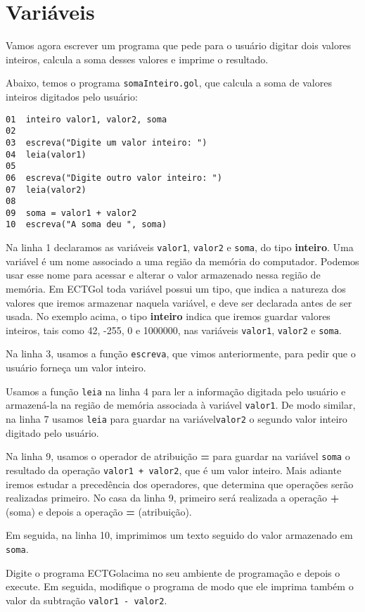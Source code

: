 \documentclass{report}
\newcommand{\Egol}{ECTGol\;}
\begin{document}
\section{Variáveis}

Vamos agora escrever um programa que pede para o usuário
digitar dois valores inteiros, calcula a soma desses valores
e imprime o resultado.

Abaixo, temos o programa \texttt{somaInteiro.gol}, que
calcula a soma de valores inteiros digitados pelo usuário:
%
\begin{verbatim}
01  inteiro valor1, valor2, soma
02
03  escreva("Digite um valor inteiro: ")
04  leia(valor1)
05
06  escreva("Digite outro valor inteiro: ")
07  leia(valor2)
08
09  soma = valor1 + valor2
10  escreva("A soma deu ", soma)
\end{verbatim}
%
Na linha 1 declaramos as variáveis \texttt{valor1}, \texttt{valor2}
e \texttt{soma}, do tipo \textbf{inteiro}. Uma variável é um nome associado
a uma região da memória do computador. Podemos usar esse nome para
acessar e alterar o valor armazenado nessa região de memória. Em \Egol
toda variável possui um tipo, que indica a natureza dos valores que
iremos armazenar naquela variável, e deve ser declarada antes de
ser usada. No exemplo acima, o tipo \textbf{inteiro} indica
que iremos guardar valores inteiros, tais como 42, -255, 0 e 1000000,
nas variáveis \texttt{valor1}, \texttt{valor2} e \texttt{soma}.
 
Na linha 3, usamos a função \texttt{escreva}, que vimos anteriormente,
para pedir que o usuário forneça um valor inteiro.

Usamos a função \texttt{leia} na linha 4 para ler a informação digitada
pelo usuário e armazená-la na região de memória associada à variável
\texttt{valor1}. De modo similar, na linha 7 usamos \texttt{leia}
para guardar na variável\texttt{valor2} o segundo valor inteiro
digitado pelo usuário.

Na linha 9, usamos o operador de atribuição \textbf{=} para guardar
na variável \texttt{soma} o resultado da operação \texttt{valor1 + valor2},
que é um valor inteiro. Mais adiante iremos estudar a precedência dos
operadores, que determina que operações serão realizadas primeiro.
No casa da linha 9, primeiro será realizada a operação \textbf{+} (soma)
e depois a operação \textbf{=} (atribuição).

Em seguida, na linha 10, imprimimos um texto seguido do valor armazenado
em \texttt{soma}. 

Digite o programa \Egol acima no seu ambiente de programação
e depois o execute. Em seguida, modifique o programa de modo que
ele imprima também o valor da subtração \texttt{valor1 - valor2}.
\end{document}
